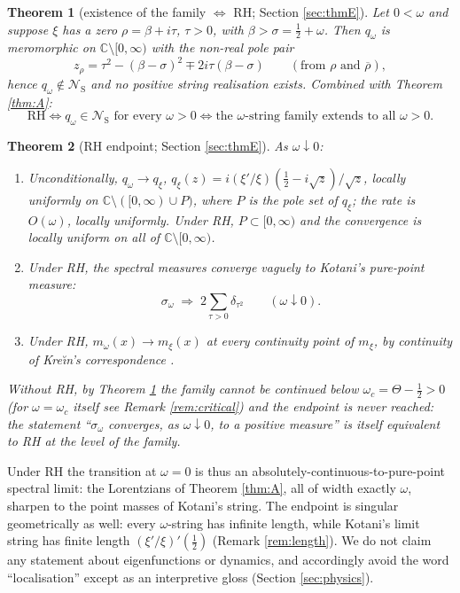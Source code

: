 \documentclass[11pt,reqno]{amsart}
\theoremstyle{plain}
\newtheorem{theorem}{Theorem}[section]
\theoremstyle{definition}
\newcommand{\C}{\mathbb{C}}
\newcommand{\NS}{\mathcal N_{\mathrm S}}
\begin{document}
\begin{theorem}[existence of the family $\Longleftrightarrow$ RH; Section \ref{sec:thmE}]\label{thm:Eprime}
Let $0<\omega$ and suppose $\xi$ has a zero $\rho=\beta+i\tau$, $\tau>0$, with
$\beta>\sigma=\tfrac12+\omega$. Then $q_\omega$ is meromorphic on $\C\setminus[0,\infty)$ with
the non-real pole pair
\[
  z_\rho=\tau^2-(\beta-\sigma)^2\mp2i\tau(\beta-\sigma)
  \qquad(\text{from } \rho \text{ and } \overline\rho),
\]
hence $q_\omega\notin\NS$ and no positive string realisation exists. Combined with
Theorem \ref{thm:A}:
\[
  \boxed{\ \text{RH}\iff q_\omega\in\NS\text{ for every }\omega>0
  \iff\text{the }\omega\text{-string family extends to all }\omega>0.\ }
\]
\end{theorem}

\begin{theorem}[RH endpoint; Section \ref{sec:thmE}]\label{thm:E}
As $\omega\downarrow0$:
\begin{enumerate}
\item[(i)] Unconditionally, $q_\omega\to q_\xi$, $q_\xi(z)=i(\xi'/\xi)(\tfrac12-i\sqrt z)/\sqrt z$,
locally uniformly on $\C\setminus([0,\infty)\cup P)$, where $P$ is the pole set of $q_\xi$; the
rate is $O(\omega)$, locally uniformly. Under RH, $P\subset[0,\infty)$ and the convergence is
locally uniform on all of $\C\setminus[0,\infty)$.
\item[(ii)] Under RH, the spectral measures converge vaguely to Kotani's pure-point measure:
\[
  \sigma_\omega\;\Longrightarrow\;2\sum_{\tau>0}\delta_{\tau^2}
  \qquad(\omega\downarrow0).
\]
\item[(iii)] Under RH, $m_\omega(x)\to m_\xi(x)$ at every continuity point of $m_\xi$, by
continuity of Kre\u\i n's correspondence \cite[Thm.~1]{Kasahara}.
\end{enumerate}
Without RH, by Theorem \ref{thm:Eprime} the family cannot be continued below
$\omega_c=\Theta-\tfrac12>0$ (for $\omega=\omega_c$ itself see Remark \ref{rem:critical}) and
the endpoint is never reached: the statement ``$\sigma_\omega$ converges, as
$\omega\downarrow0$, to a positive measure'' is itself equivalent to RH at the level of the
family.
\end{theorem}

Under RH the transition at $\omega=0$ is thus an absolutely-continuous-to-pure-point spectral
limit: the Lorentzians of Theorem \ref{thm:A}, all of width exactly $\omega$, sharpen to the
point masses of Kotani's string. The endpoint is singular geometrically as well: every
$\omega$-string has infinite length, while Kotani's limit string has finite length
$(\xi'/\xi)'(\tfrac12)$ (Remark \ref{rem:length}). We do not claim any statement about
eigenfunctions or dynamics, and accordingly avoid the word ``localisation'' except as an
interpretive gloss (Section \ref{sec:physics}).
\end{document}
